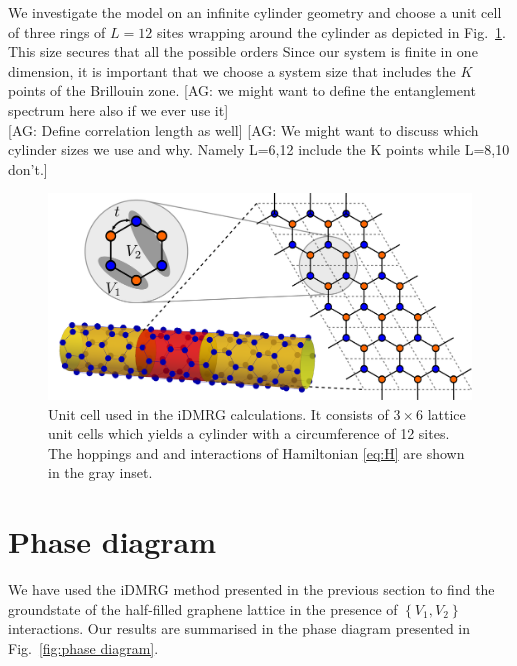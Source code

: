 \documentclass[aps,prx,10pt,twocolumn,floatfix,superscriptaddress,showpacs,numerical,footinbib]{revtex4-1}
\newcommand{\noteAG}[1]{{\color{blue} [AG: #1]}}
\begin{document}
We investigate the model on an infinite cylinder geometry and choose a unit cell of three rings of $L=12$ sites wrapping around the cylinder as depicted in Fig.~\ref{fig:Defs}. This size secures that all the possible orders   Since our system is finite in one dimension, it is important that we choose a system size that includes the $K$ points of the Brillouin zone. 
%
\noteAG{we might want to define the entanglement spectrum here also if we ever use it}\\
\noteAG{Define correlation length as well}
\noteAG{We might want to discuss which cylinder sizes we use and why. Namely L=6,12 include the K points while L=8,10 don't.}
%

\begin{figure}
 \includegraphics[width=\columnwidth]{pdf/unit_cell.pdf}
 \caption{Unit cell used in the iDMRG calculations. It consists of $3 \times 6$ lattice unit cells which yields a cylinder with a circumference of 12 sites. The hoppings and and interactions of Hamiltonian \eqref{eq:H} are shown in the gray inset.  \label{fig:Defs}}
\end{figure}
\section{Phase diagram}
%
We have used the iDMRG method presented in the previous section
to find the groundstate of the half-filled graphene lattice in the presence of 
$\left\lbrace V_{1},V_{2}\right\rbrace$ interactions.
%
Our results are summarised in the phase diagram presented in Fig.~\ref{fig:phase diagram}.
\end{document}
